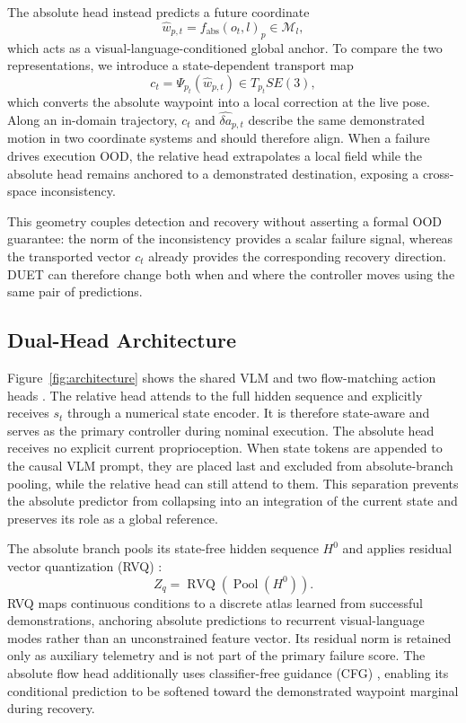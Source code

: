\documentclass[letterpaper, 10 pt, conference]{ieeeconf}
\begin{document}
The absolute head instead predicts a future coordinate
\begin{equation}
    \hat{w}_{p,t}=f_{\mathrm{abs}}(o_t,l)_p\in\mathcal{M}_l,
\end{equation}
which acts as a visual-language-conditioned global anchor. To compare the two representations, we introduce a state-dependent transport map
\begin{equation}
    c_t=\Psi_{p_t}(\hat{w}_{p,t})\in T_{p_t}SE(3),
    \label{eq:transport_map}
\end{equation}
which converts the absolute waypoint into a local correction at the live pose. Along an in-domain trajectory, $c_t$ and $\hat{\delta a}_{p,t}$ describe the same demonstrated motion in two coordinate systems and should therefore align. When a failure drives execution OOD, the relative head extrapolates a local field while the absolute head remains anchored to a demonstrated destination, exposing a cross-space inconsistency.

This geometry couples detection and recovery without asserting a formal OOD guarantee: the norm of the inconsistency provides a scalar failure signal, whereas the transported vector $c_t$ already provides the corresponding recovery direction. DUET can therefore change both when and where the controller moves using the same pair of predictions.

\subsection{Dual-Head Architecture}
Figure~\ref{fig:architecture} shows the shared VLM and two flow-matching action heads \cite{diffusionpolicy,pi0}. The relative head attends to the full hidden sequence and explicitly receives $s_t$ through a numerical state encoder. It is therefore state-aware and serves as the primary controller during nominal execution. The absolute head receives no explicit current proprioception. When state tokens are appended to the causal VLM prompt, they are placed last and excluded from absolute-branch pooling, while the relative head can still attend to them. This separation prevents the absolute predictor from collapsing into an integration of the current state and preserves its role as a global reference.

The absolute branch pools its state-free hidden sequence $H^0$ and applies residual vector quantization (RVQ) \cite{vqvae,rvq}:
\begin{equation}
    Z_q=\operatorname{RVQ}\!\left(\operatorname{Pool}(H^0)\right).
\end{equation}
RVQ maps continuous conditions to a discrete atlas learned from successful demonstrations, anchoring absolute predictions to recurrent visual-language modes rather than an unconstrained feature vector. Its residual norm is retained only as auxiliary telemetry and is not part of the primary failure score. The absolute flow head additionally uses classifier-free guidance (CFG) \cite{cfg}, enabling its conditional prediction to be softened toward the demonstrated waypoint marginal during recovery.
\end{document}
